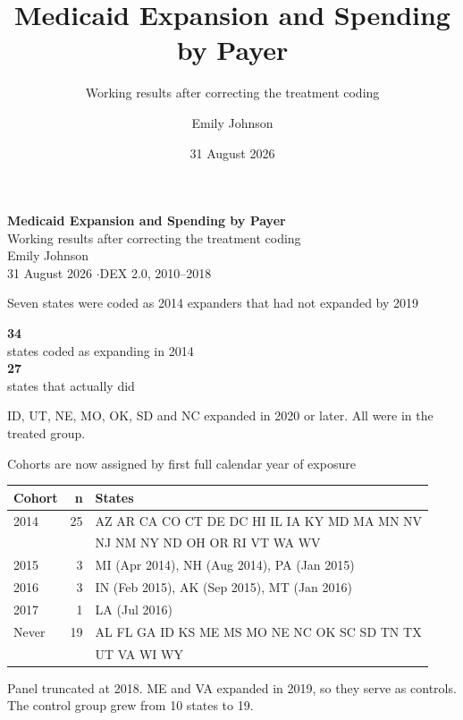 \documentclass[aspectratio=169,11pt]{beamer}
\title{Medicaid Expansion and Spending by Payer}
\subtitle{Working results after correcting the treatment coding}
\author{Emily Johnson}
\date{31 August 2026}
\begin{document}
{
\begin{frame}[plain]
  \vfill
  \begin{center}
    {\huge\bfseries\color{DeepNavy} Medicaid Expansion and Spending by Payer}\\[0.35cm]
    {\large\color{WarmGray} Working results after correcting the treatment coding}\\[1.1cm]
    {\normalsize\color{DeepNavy} Emily Johnson}\\[0.15cm]
    {\small\color{WarmGray} 31 August 2026 \quad$\cdot$\quad DEX 2.0, 2010--2018}
  \end{center}
  \vfill
\end{frame}}

\begin{frame}{Seven states were coded as 2014 expanders that had not expanded by 2019}
  \vfill
  \begin{center}
    {\fontsize{58}{62}\selectfont\bfseries\color{DeepRed} 34}\\[0.2cm]
    {\large\color{DeepNavy} states coded as expanding in 2014}\\[0.6cm]
    {\fontsize{58}{62}\selectfont\bfseries\color{Teal} 27}\\[0.2cm]
    {\large\color{DeepNavy} states that actually did}
  \end{center}
  \vfill
  {\footnotesize\color{WarmGray} ID, UT, NE, MO, OK, SD and NC expanded in 2020 or later. All were in the treated group.}
\end{frame}

\begin{frame}{Cohorts are now assigned by first full calendar year of exposure}
  \vspace{0.2cm}
  \begin{center}
  {\large
  \begin{tabular}{@{}l r l@{}}
    \toprule
    \textbf{Cohort} & \textbf{n} & \textbf{States} \\
    \midrule
    2014  & 25 & AZ AR CA CO CT DE DC HI IL IA KY MD MA MN NV \\
          &    & NJ NM NY ND OH OR RI VT WA WV \\[0.15cm]
    2015  & 3  & MI (Apr 2014), NH (Aug 2014), PA (Jan 2015) \\[0.15cm]
    2016  & 3  & IN (Feb 2015), AK (Sep 2015), MT (Jan 2016) \\[0.15cm]
    2017  & 1  & LA (Jul 2016) \\[0.15cm]
    Never & 19 & AL FL GA ID KS ME MS MO NE NC OK SC SD TN TX \\
          &    & UT VA WI WY \\
    \bottomrule
  \end{tabular}}
  \end{center}
  \vspace{0.25cm}
  {\footnotesize\color{WarmGray} Panel truncated at 2018. ME and VA expanded in 2019, so they serve as controls. The control group grew from 10 states to 19.}
\end{frame}
\end{document}
